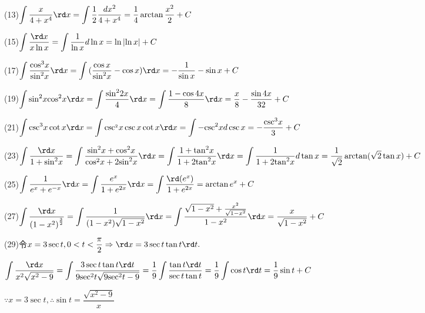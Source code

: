 (13)$\displaystyle\int {\dfrac{x}{{4 + {x^4}}}} \rd x = \displaystyle\int {\dfrac{1}{2}} \dfrac{{d{x^2}}}{{4 + {x^4}}} = \dfrac{1}{4}\arctan \dfrac{{{x^2}}}{2} + C$

(15)$\displaystyle\int {\dfrac{{\rd x}}{{x\ln x}}}  = \displaystyle\int {\dfrac{1}{{\ln x}}} d\ln x = \ln \left| {\ln x} \right| + C$

(17)$\displaystyle\int {\dfrac{{{{\cos }^3}x}}{{{{\sin }^2}x}}} \rd x = \displaystyle\int {(\dfrac{{\cos x}}{{{{\sin }^2}x}} - \cos x)\rd x =  - \dfrac{1}{{\sin x}} - \sin x + C} $

(19)$\displaystyle\int {{{\sin }^2}x} {\cos ^2}x\rd x = \displaystyle\int {\dfrac{{{{\sin }^2}2x}}{4}} \rd x = \displaystyle\int {\dfrac{{1 - \cos 4x}}{8}} \rd x = \dfrac{x}{8} - \dfrac{{\sin 4x}}{{32}} + C$

(21)$\displaystyle\int {{{\csc }^3}x} \cot x\rd x = \displaystyle\int {{{\csc }^{_2}}x} \csc x\cot x\rd x = \displaystyle\int { - {{\csc }^2}x} d\csc x =  - \frac{{{{\csc }^3}x}}{3} + C$

(23)$\displaystyle\int {\dfrac{{\rd x}}{{1 + {{\sin }^2}x}}} = \displaystyle\int {\dfrac{{{{\sin }^2}x + {{\cos }^2}x}}{{{{\cos }^2}x + 2{{\sin }^2}x}}} \rd x = \displaystyle\int {\dfrac{{1 + {{\tan }^2}x}}{{1 + 2{{\tan }^2}x}}} \rd x = \displaystyle\int {\dfrac{1}{{1 + 2{{\tan }^2}x}}} d\tan x = \dfrac{1}{{\sqrt 2 }}\arctan (\sqrt 2 \tan x) + C$

(25)$\displaystyle\int {\dfrac{1}{{{e^x} + {e^{ - x}}}}} \rd x = \displaystyle\int {\dfrac{{{e^x}}}{{1 + {e^{2x}}}}} \rd x = \displaystyle\int {\dfrac{{\rd ({e^x})}}{{1 + {e^{2x}}}}}  = \arctan {e^x} + C$

(27)$\displaystyle\int {\dfrac{{\rd x}}{{{{(1 - {x^2})}^{\frac{3}{2}}}}}}  = \displaystyle\int {\dfrac{1}{{(1 - {x^2})\sqrt {1 - {x^2}} }}} \rd x = \displaystyle\int {\dfrac{{\sqrt {1 - {x^2}}  + \frac{{{x^2}}}{{\sqrt {1 - {x^2}} }}}}{{1 - {x^2}}}} \rd x = \dfrac{x}{{\sqrt {1 - {x^2}} }} + C$

(29)令$x = 3\sec t,0 < t < \dfrac{\pi }{2} \Rightarrow \rd x = 3\sec t\tan t\rd t.$

$\displaystyle\int {\dfrac{{\rd x}}{{{x^2}\sqrt {{x^2} - 9} }}}  = \displaystyle\int {\dfrac{{3\sec t\tan t\rd t}}{{9{{\sec }^2}t\sqrt {9{{\sec }^2}t - 9} }}}  = \dfrac{1}{9}\displaystyle\int {\dfrac{{\tan t\rd t}}{{\sec t\tan t}}}  = \dfrac{1}{9}\displaystyle\int {\cos t\rd t}  = \dfrac{1}{9}\sin t + C$

$\because x = 3\sec t,\therefore \sin t = \dfrac{{\sqrt {{x^2} - 9} }}{x}$


